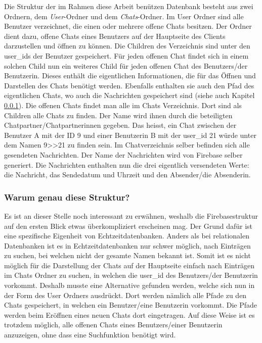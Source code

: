 \documentclass[a4paper,11pt]{report}
\begin{document}
				Die Struktur der im Rahmen diese Arbeit benützen Datenbank besteht aus zwei Ordnern, dem \emph{User}-Ordner und dem \emph{Chats}-Ordner. Im User Ordner	sind alle Benutzer verzeichnet, die einen oder mehrere offene Chats besitzen. Der Ordner dient dazu, offene Chats eines Benutzers auf der Hauptseite des Clients darzustellen und öffnen zu können. Die Children des Verzeichnis sind unter den user\_ids der Benutzer gespeichert. Für jeden offenen Chat findet sich in einem solchen Child nun ein weiteres Child für jeden offenen Chat des Benutzers/der Benutzerin. Dieses enthält die eigentlichen Informationen, die für das Öffnen und Darstellen des Chats benötigt werden. Ebenfalls enthalten sie auch den Pfad des eigentlichen Chats, wo auch die Nachrichten gespeichert sind (siehe auch Kapitel \ref{warum}). Die offenen Chats findet man alle im Chats Verzeichnis. Dort sind als Children alle Chats zu finden. Der Name wird ihnen durch die beteiligten Chatpartner/Chatpartnerinnen gegeben. Das heisst, ein Chat zwischen der Benutzer A mit der ID 9 und einer Benutzerin B mit der user\_id 21 würde unter dem Namen 9\textgreater\textgreater21 zu finden sein. Im Chatverzeichnis selber befinden sich alle gesendeten Nachrichten. Der Name der Nachrichten wird von Firebase selber generiert. Die Nachrichten enthalten nun die drei eigentlich versendeten Werte: die Nachricht, das Sendedatum und Uhrzeit und den Absender/die Absenderin.
				
				\subsubsection{Warum genau diese Struktur?} \label{warum}
				Es ist an dieser Stelle noch interessant zu erwähnen, weshalb die Firebasestruktur auf den ersten Blick etwas überkompliziert erscheinen mag. Der Grund dafür ist eine spezifische Eigenheit von Echtzeitdatenbanken. Anders als bei relationalen Datenbanken ist es in Echtzeitdatenbanken nur schwer möglich, nach Einträgen zu suchen, bei welchen nicht der gesamte Namen bekannt ist. Somit ist es nicht möglich für die Darstellung der Chats auf der Hauptseite einfach nach Einträgen im Chats Ordner zu suchen, in welchen die user\_id des Benutzers/der Benutzerin vorkommt. Deshalb musste eine Alternative gefunden werden, welche sich nun in der Form des User Ordners ausdrückt. Dort werden nämlich alle Pfade zu den Chats gespeichert, in welchen ein Benutzer/eine Benutzerin vorkommt. Die Pfade werden beim Eröffnen eines neuen Chats dort eingetragen. Auf diese Weise ist es trotzdem möglich, alle offenen Chats eines Benutzers/einer Benutzerin anzuzeigen, ohne dass eine Suchfunktion benötigt wird.
\end{document}
